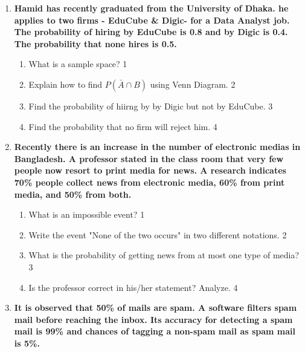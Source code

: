 \documentclass[a4paper,oneside, margin=1.4in]{book}
\begin{document}
\begin{enumerate}
  \begin{enumerate}
    \item  
	Find the number of products characterized as “personal use” \hfill 3
    \item
	Question \hfill 4
  \end{enumerate}

  
   \item
  \textbf{Hamid has recently graduated from the University of Dhaka. he applies to two firms - EduCube \& Digic- for a Data Analyst job. The probability of hiring by EduCube is 0.8 and by Digic is 0.4. The probability that none hires is 0.5.} 
  
  \begin{enumerate}
    \item
	What is a sample space? \hfill 1
    \item
	Explain how to find $P(\bar A \cap B)$ using Venn Diagram. \hfill 2
    \item  
	Find the probability of hiirng by by Digic but not by EduCube. \hfill 3
    \item
	Find the probability that no firm will reject him. \hfill 4
  \end{enumerate}

 \item
	  \textbf{Recently there is an increase in the number of electronic medias in Bangladesh. A professor stated in the class room that very few people now resort to print media for news. A research indicates 70\% people collect news from electronic media, 60\% from print media, and 50\% from both.} 
  
  \begin{enumerate}
    \item
	What is an impossible event? \hfill 1
    \item
	Write the event "None of the two occurs" in two different notations. \hfill 2
    \item  
	What is the probability of getting news from at most one type of media? \hfill 3
    \item
	Is the professor correct in his/her statement? Analyze. \hfill 4
  \end{enumerate}
  
  
     \item
	  \textbf{It is observed that 50\% of mails are spam. A software 
	  filters spam mail before reaching the inbox. Its accuracy for detecting a spam mail is 99\% and chances of tagging a non-spam mail as spam mail is 5\%.} 
  

\end{enumerate}
\end{document}
